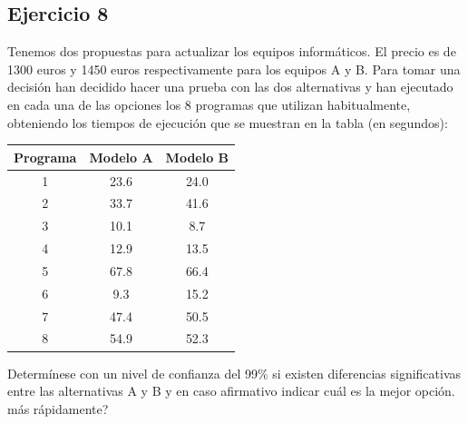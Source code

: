 \subsection{Ejercicio 8}
\noindent
Tenemos dos propuestas para actualizar los equipos informáticos. El precio es de 1300 euros y 1450 euros respectivamente para los equipos A y B. Para tomar una decisión han decidido hacer una prueba con las dos alternativas y han ejecutado en cada una de las opciones los 8 programas que utilizan habitualmente, obteniendo los tiempos de ejecución que se muestran en la tabla (en segundos):
\begin{table}[H]
\centering
\begin{tabular}{|c|c|c|}
\hline
\textbf{Programa} & \textbf{Modelo A} & \textbf{Modelo B} \\ \hline
1                 & 23.6              & 24.0              \\ \hline
2                 & 33.7              & 41.6              \\ \hline
3                 & 10.1              & 8.7               \\ \hline
4                 & 12.9              & 13.5              \\ \hline
5                 & 67.8              & 66.4              \\ \hline
6                 & 9.3               & 15.2              \\ \hline
7                 & 47.4              & 50.5              \\ \hline
8                 & 54.9              & 52.3              \\ \hline
\end{tabular}
\end{table}
\noindent
Determínese con un nivel de confianza del 99\% si existen diferencias significativas entre las alternativas A y B y en caso afirmativo indicar cuál es la mejor opción.
más rápidamente?
